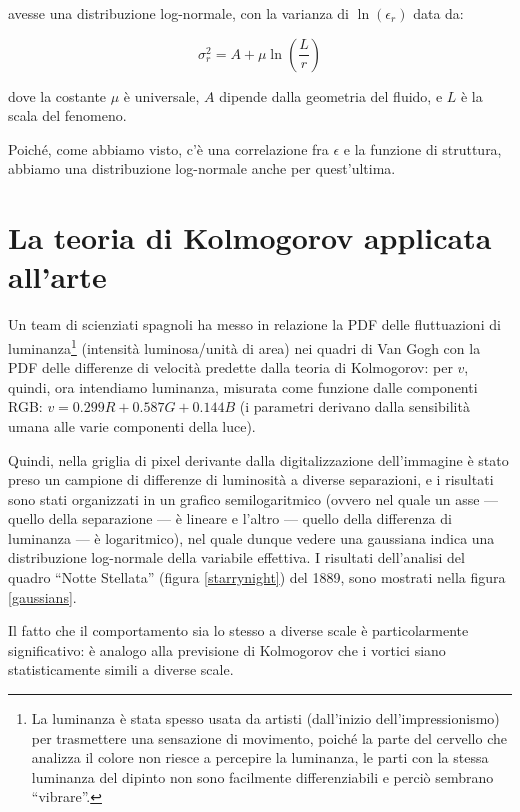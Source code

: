 \documentclass[12pt,a4paper]{article}
\numberwithin{equation}{section}
\begin{document}
avesse una distribuzione log-normale, con la varianza di $\ln (\epsilon_r)$ data da:

\begin{equation}
\sigma ^2 _r = A + \mu \ln \left(
\frac{L}{r}
\right)
\end{equation}

dove la costante $\mu$ è universale, $A$ dipende dalla geometria del fluido, e $L$ è la scala del fenomeno. 

Poiché, come abbiamo visto, c'è una correlazione fra $\epsilon$ e la funzione di struttura, abbiamo una distribuzione log-normale anche per quest'ultima.

\section{La teoria di Kolmogorov applicata all'arte}

Un team di scienziati spagnoli \cite{study2006} ha messo in relazione la PDF delle fluttuazioni di luminanza\footnote{La luminanza è stata spesso usata da artisti (dall'inizio dell'impressionismo) per trasmettere una sensazione di movimento, poiché la parte del cervello che analizza il colore non riesce a percepire la luminanza, le parti con la stessa luminanza del dipinto non sono facilmente differenziabili e perciò sembrano ``vibrare''.} (intensità luminosa/unità di area) nei quadri di Van Gogh con la PDF delle differenze di velocità predette dalla teoria di Kolmogorov: per $v$, quindi, ora intendiamo luminanza, misurata come funzione dalle componenti RGB: $v = 0.299 R + 0.587 G + 0.144B$ (i parametri derivano dalla sensibilità umana alle varie componenti della luce).

Quindi, nella griglia di pixel derivante dalla digitalizzazione dell'immagine è stato preso un campione di differenze di luminosità a diverse separazioni, e i risultati sono stati organizzati in un grafico semilogaritmico (ovvero nel quale un asse --- quello della separazione --- è lineare e l'altro --- quello della differenza di luminanza --- è logaritmico), nel quale dunque vedere una gaussiana indica una distribuzione log-normale della variabile effettiva.
I risultati dell'analisi del quadro ``Notte Stellata'' (figura \ref{starrynight}) del 1889, sono mostrati nella figura \ref{gaussians}.

Il fatto che il comportamento sia lo stesso a diverse scale è particolarmente significativo: è analogo alla previsione di Kolmogorov che i vortici siano statisticamente simili a diverse scale.
\end{document}
